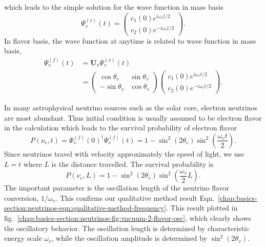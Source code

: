 which leads to the simple solution for the wave function in mass basis
\begin{equation}
\Psi_v^{(v)}(t) = \begin{pmatrix}
c_1(0) e^{i \omega_v t/2 } \\
c_2(0) e^{ -i\omega_v t/2 }
\end{pmatrix}.
\end{equation}
In flavor basis, the wave function at anytime is related to wave function in mass basis,
\begin{align}
\Psi_v^{(f)}(t) &= \mathbf{U}_v\Psi_v^{(v)}(t) \\
& = \begin{pmatrix} \cos\theta_v & \sin \theta_v \\ -\sin \theta_v & \cos \theta_v \end{pmatrix} \begin{pmatrix} c_1(0) e^{i\omega_v t/2 } \\
c_2(0) e^{ -i\omega_v t/2 }    \end{pmatrix} .
\end{align}

In many astrophysical neutrino sources such as the solar core, electron neutrinos are most abundant. Thus initial condition is usually assumed to be electron flavor in the calculation which leads to the survival probability of electron flavor
\begin{equation}
P(\nu_e,t) = \Psi_v^{(f)}(0)^\dagger \Psi_v^{(f)}(t) = 1-\sin^2(2\theta_v)\sin^2\left( \frac{\omega_v t}{2} \right).
\end{equation}
Since neutrinos travel with velocity approximately the speed of light, we use $L = t$ where $L$ is the distance travelled. The survival probability is
\begin{equation}
P(\nu_e,L) =  1-\sin^2(2\theta_v)\sin^2\left( \frac{\omega_v}{2} L \right).
\end{equation}
The important parameter is the oscillation length of the neutrino flavor conversion, $1/\omega_v$. This confirms our qualitative method result Eqn.~\ref{chap:basics-section:neutrinos-eqn:qualitative-method-frequency}. This result plotted in fig.~\ref{chap:basics-section:neutrinos-fig:vacuum-2-flavor-osc}, which clearly shows the oscillatory behavior. The oscillation length is determined by characteristic energy scale $\omega_v$, while the oscillation amplitude is determined by $\sin^2(2\theta_v)$.

